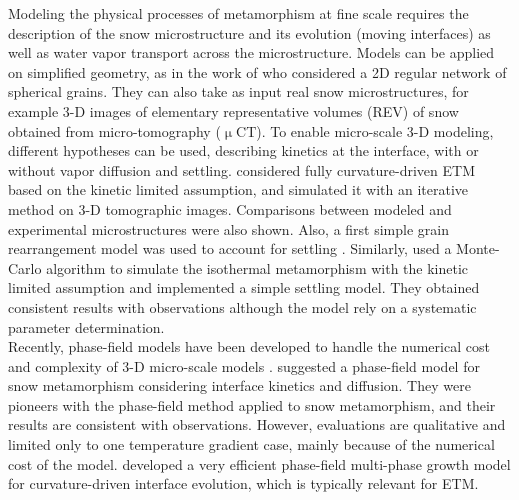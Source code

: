 \documentclass[draft,ms]{agujournal2019}
\begin{document}
Modeling the physical processes of metamorphism at fine scale requires the description of the snow microstructure and its evolution (moving interfaces) as well as water vapor transport across the microstructure. Models can be applied on simplified geometry, as in the work of  who considered a 2D regular network of spherical grains. They can also take as input real snow microstructures, for example 3-D images of elementary representative volumes (REV) of snow obtained from micro-tomography ($\upmu$CT). To enable micro-scale 3-D modeling, different hypotheses can be used, describing kinetics at the interface, with or without vapor diffusion and settling.  considered fully curvature-driven ETM based on the kinetic limited assumption, and simulated it with an iterative method on 3-D tomographic images. Comparisons between modeled and experimental microstructures were also shown. Also, a first simple grain rearrangement model was used to account for settling \cite{flin2004snow}. Similarly,  used a Monte-Carlo algorithm to simulate the isothermal metamorphism with the kinetic limited assumption and implemented a simple settling model. They obtained consistent results with observations although the model rely on a systematic parameter determination.\\
Recently, phase-field models have been developed to handle the numerical cost and complexity of 3-D micro-scale models \cite{bretin_phase-field_2019,Demange_2017,granger_physique_2019, kaempfer_phase-field_2009}.  suggested a phase-field model for snow metamorphism considering interface kinetics and diffusion. They were pioneers with the phase-field method applied to snow metamorphism, and their results are consistent with observations. However, evaluations are qualitative and limited only to one temperature gradient case, mainly because of the numerical cost of the model. 
  developed a very efficient phase-field multi-phase growth model for curvature-driven interface evolution, which is typically relevant for ETM.\\
\end{document}

